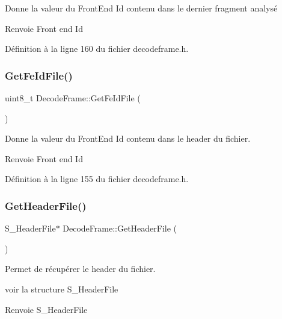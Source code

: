 Donne la valeur du Front\+End Id contenu dans le dernier fragment analysé 

\begin{DoxyReturn}{Renvoie}
Front end Id 
\end{DoxyReturn}


Définition à la ligne 160 du fichier decodeframe.\+h.

\mbox{\label{class_decode_frame_a0e408e31eabbebea698d4f3122b79427}} 
\subsubsection{\texorpdfstring{Get\+Fe\+Id\+File()}{GetFeIdFile()}}
{\footnotesize\ttfamily uint8\+\_\+t Decode\+Frame\+::\+Get\+Fe\+Id\+File (\begin{DoxyParamCaption}{ }\end{DoxyParamCaption})\hspace{0.3cm}{\ttfamily [inline]}}



Donne la valeur du Front\+End Id contenu dans le header du fichier. 

\begin{DoxyReturn}{Renvoie}
Front end Id 
\end{DoxyReturn}


Définition à la ligne 155 du fichier decodeframe.\+h.

\mbox{\label{class_decode_frame_ae77129fbf6e42f2260db3d215a954026}} 
\subsubsection{\texorpdfstring{Get\+Header\+File()}{GetHeaderFile()}}
{\footnotesize\ttfamily S\+\_\+\+Header\+File$\ast$ Decode\+Frame\+::\+Get\+Header\+File (\begin{DoxyParamCaption}{ }\end{DoxyParamCaption})}



Permet de récupérer le header du fichier. 

voir la structure S\+\_\+\+Header\+File \begin{DoxyReturn}{Renvoie}
S\+\_\+\+Header\+File 
\end{DoxyReturn}
\mbox{\label{class_decode_frame_a827eb5508bf71de0b80300e967ca4a94}} 

